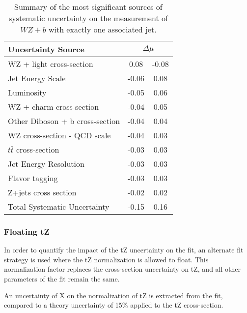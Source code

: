 \begin{table}[H]                                                                                                             
    \centering                                                                                                               
    \begin{tabular}{l|cc}
        \hline\hline
        Uncertainty Source & \multicolumn{2}{c}{$\Delta \mu$ }  \\
        \hline
        WZ + light cross-section & 0.08 & -0.08 \\
        Jet Energy Scale & -0.06 & 0.08 \\
        Luminosity & -0.05 & 0.06 \\
        WZ + charm cross-section & -0.04 & 0.05 \\
        Other Diboson + b cross-section & -0.04 & 0.04 \\
        WZ cross-section - QCD scale & -0.04 & 0.03 \\
        $t\bar{t}$ cross-section & -0.03 & 0.03 \\
        Jet Energy Resolution & -0.03 & 0.03 \\
        Flavor tagging & -0.03 & 0.03 \\
        Z+jets cross section & -0.02 & 0.02 \\
        \hline
        Total Systematic Uncertainty & -0.15 & 0.16 \\
        \hline\hline
  \end{tabular}
  \caption{Summary of the most significant sources of systematic uncertainty on the measurement of $WZ+b$ with exactly one associated jet.}
  \label{tab:systematics_tZ1j}
\end{table}

\subsubsection{Floating tZ}
\label{sec:float_tZ}

In order to quantify the impact of the tZ uncertainty on the fit, an alternate fit strategy is used where the tZ normalization is allowed to float. This normalization factor replaces the cross-section uncertainty on tZ, and all other parameters of the fit remain the same.

An uncertainty of X on the normalization of tZ is extracted from the fit, compared to a theory uncertainty of 15\% applied to the tZ cross-section.
